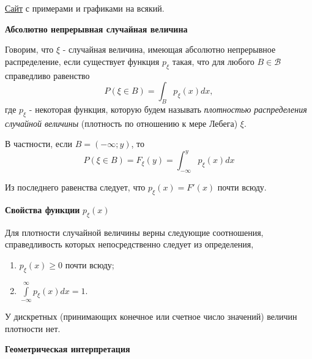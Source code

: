 \href{https://medium.com/@congyuzhou/%D0%BF%D0%BB%D0%BE%D1%82%D0%BD%D0%BE%D1%81%D1%82%D1%8C-%D1%80%D0%B0%D1%81%D0%BF%D1%80%D0%B5%D0%B4%D0%B5%D0%BB%D0%B5%D0%BD%D0%B8%D1%8F-%D0%B2%D0%B5%D1%80%D0%BE%D1%8F%D1%82%D0%BD%D0%BE%D1%81%D1%82%D0%B5%D0%B9-31d19a680f16}{Сайт} с примерами и графиками на всякий.

\noindent \textbf{Абсолютно непрерывная случайная величина}

Говорим, что $\xi$ - случайная величина, имеющая абсолютно непрерывное распределение, если существует функция $p_{\xi}$ такая, что для любого $B \in \mathcal{B}$ справедливо равенство
\[ P(\xi \in B) = \int_B p_{\xi} (x) dx, \]
где $p_{\xi}$ - некоторая функция, которую будем называть \textit{плотностью распределения случайной величины} (плотность по отношению к мере Лебега) $\xi$.

В частности, если $B = (-\infty; y)$, то
\[ P(\xi \in B) = F_{\xi} (y) = \int_{-\infty}^{y} p_{\xi} (x) dx \]

Из последнего равенства следует, что $p_{\xi} (x) = F' (x)$ почти всюду.

\textbf{Свойства функции} $p_{\xi} (x)$

Для плотности случайной величины верны следующие соотношения, справедливость которых непосредственно следует из определения,
\begin{enumerate}
	\item $p_{\xi} (x) \ge 0$ почти всюду;
	\item $\int\limits_{-\infty}^{\infty} p_{\xi} (x) dx = 1$.
\end{enumerate}

\begin{remark}
	У дискретных (принимающих конечное или счетное число значений) величин плотности нет.
\end{remark}

\noindent \textbf{Геометрическая интерпретация}

